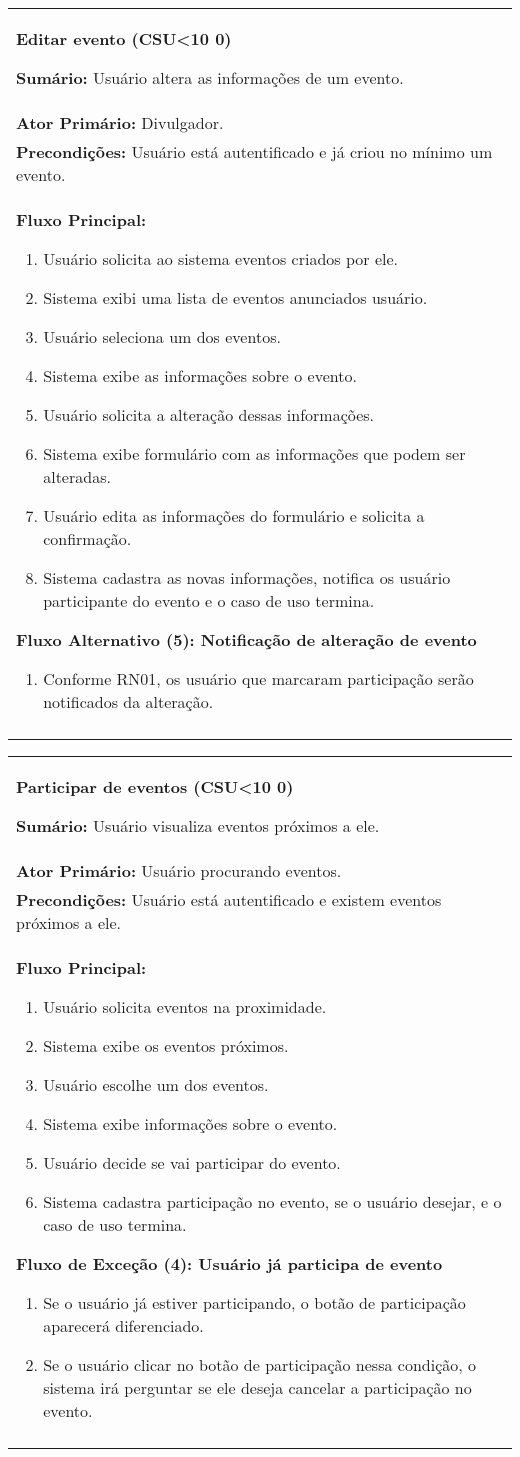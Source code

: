 \documentclass{article}
\newcounter{cscounter}
\newcommand{\sumario}[1] {\textbf{Sumário:} #1\\ }
\newcommand{\ator}[1] {\textbf{Ator Primário:} #1\\}
\newcommand{\precond}[1] {\textbf{Precondições:} #1\\}
\newcommand{\fluxo}{\textbf{Fluxo Principal:}}
\newenvironment{fluxoa}[2]
	{
		\textbf{Fluxo Alternativo (#1): #2}
		\begin{enumerate}[itemsep=0mm, label=(\alph*)]			
	}
	{
		\end{enumerate}			
	}
\newenvironment{fluxoe}[2]
	{
		\textbf{Fluxo de Exceção (#1): #2}
		\begin{enumerate}[itemsep=0mm, label=(\alph*)]			
	}
	{
		\end{enumerate}			
	}
\newenvironment{casosdeuso}[1]
{
 \stepcounter{cscounter}
 \begin{center}
 \begin{tabular}{|p{\textwidth}|}
 \hline
 \begin{center}
 \large \textbf{#1 (CSU\ifnum\value{cscounter}<10 0\fi\arabic{cscounter})}
 \end{center}
}
{ 
 \\\\\hline
 \end{tabular} 
 \end{center}
}
\begin{document}
\begin{casosdeuso}{Editar evento}
 \sumario{Usuário altera as informações de um evento.}
 \ator{Divulgador.}
 \precond{Usuário está autentificado e já criou no mínimo um evento.}
\fluxo
\begin{enumerate}[itemsep=0mm]
 \item Usuário solicita ao sistema eventos criados por ele.
 \item Sistema exibi uma lista de eventos anunciados usuário.
 \item Usuário seleciona um dos eventos.
 \item Sistema exibe as informações sobre o evento.
 \item Usuário solicita a alteração dessas informações.
 \item Sistema exibe formulário com as informações que podem ser alteradas.
 \item Usuário edita as informações do formulário e solicita a confirmação.
 \item Sistema cadastra as novas informações, notifica os usuário participante do evento e o caso de uso termina.
\end{enumerate}
\begin{fluxoa}{5}{Notificação de alteração de evento}
 \item Conforme RN01, os usuário que marcaram participação serão notificados da alteração.
\end{fluxoa}
\end{casosdeuso}

\begin{casosdeuso}{Participar de  eventos}
 \sumario{Usuário visualiza eventos próximos a ele.}
 \ator{Usuário procurando eventos.}
 \precond{Usuário está autentificado e existem eventos próximos a ele.}
\fluxo
\begin{enumerate}[itemsep=0mm]
 \item Usuário solicita eventos na proximidade.
 \item Sistema exibe os eventos próximos.
 \item Usuário escolhe um dos eventos.
 \item Sistema exibe informações sobre o evento.
 \item Usuário decide se vai participar do evento.
 \item Sistema cadastra participação no evento, se o usuário desejar, e o caso de uso termina.
 \end{enumerate}
 \begin{fluxoe}{4}{Usuário já participa de evento}
 \item Se o usuário já estiver participando, o botão de participação aparecerá diferenciado.
 \item Se o usuário clicar no botão de participação nessa condição, o sistema irá perguntar se ele deseja cancelar a participação no evento.
 \end{fluxoe} 
\end{casosdeuso}
\end{document}
